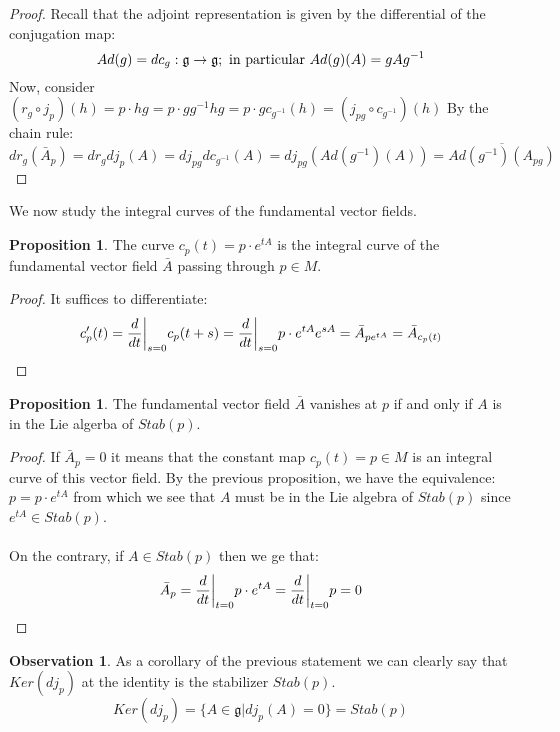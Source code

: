 \documentclass[12pt,a4paper]{report}
\theoremstyle{definition}
\theoremstyle{Theorem}
\newtheorem{Prop}[Def]{Proposition}
\theoremstyle{definition}
\theoremstyle{definition}
\newtheorem{Obs}[Def]{Observation}
\begin{document}
		\begin{proof}
			Recall that the adjoint representation is given by the differential of the conjugation map:
			$$Ad(g)=dc_g:\mathfrak{g}\rightarrow\mathfrak{g};\hbox{ in particular }Ad(g)(A)=gAg^{-1}$$
			Now, consider $(r_g\circ j_p)(h)=p\cdot hg=p\cdot gg^{-1}hg=p\cdot g c_{g^{-1}}(h)=(j_{pg}\circ c_{g^{-1}})(h)$
			By the chain rule:
			$$dr_g(\bar{A}_p)=dr_gdj_p(A)=dj_{pg}dc_{g^{-1}}(A)=dj_{pg}(Ad(g^{-1})(A))=\overline{Ad(g^{-1})(A_{pg})}$$
		\end{proof}
		We now study the integral curves of the fundamental vector fields.
		\begin{Prop}
			The curve $c_p(t)=p\cdot e^{tA}$ is the integral curve of the fundamental vector field $\bar{A}$ passing through $p\in M$.
		\end{Prop}
		\begin{proof}
			It suffices to differentiate:
			$$c'_p(t)={d\over dt}\bigg|_{s=0}c_p(t+s)=
			{d\over dt}\bigg|_{s=0}p\cdot e^{tA}e^{sA}=\bar{A}_{pe^{tA}}=
			\bar{A}_{c_p(t)}$$
		\end{proof}
		\begin{Prop}
			The fundamental vector field $\bar{A}$ vanishes at $p$ if and only if $A$ is in the Lie algerba of $Stab(p)$.
		\end{Prop}
		\begin{proof}
			If $\bar{A}_p=0$ it means that the constant map $c_p(t)=p\in M$ is an integral curve of this vector field. By the previous proposition, we have the equivalence:
			$p=p\cdot e^{tA}$ from which we see that $A$ must be in the Lie algebra of $Stab(p)$ since $e^{tA}\in Stab(p)$.\\
			\\
			On the contrary, if $A\in Stab(p)$ then we ge that:
			$$\bar{A}_p={d\over dt}\bigg|_{t=0}p\cdot e^{tA}=
			{d\over dt}\bigg|_{t=0}p=0$$
		\end{proof}
		\begin{Obs}\label{Kerdj}
			As a corollary of the previous statement we can clearly say that $Ker(dj_p)$ at the identity is the stabilizer $Stab(p)$.
			$$Ker (dj_p)=\{A\in \mathfrak{g}|dj_p(A)=0\}=Stab(p)$$
		\end{Obs}
\end{document}
